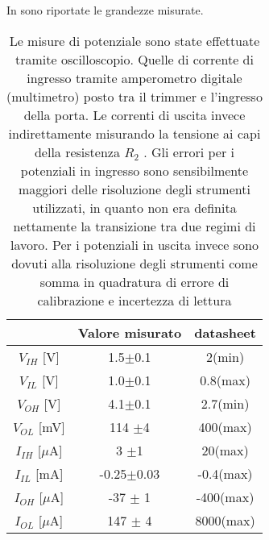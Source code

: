 In  sono riportate le grandezze misurate.\\
\begin{table}[h]
	\centering
	\begin{tabular}{ccc}
		{} & {Valore misurato} & {datasheet} \\
		\hline
    $V_{IH}$ [V] 	  & 1.5$\pm$0.1&  2(min) \\
    $V_{IL}$ [V]	  & 1.0$\pm$0.1&  0.8(max)  \\
    $V_{OH}$ [V]	  & 4.1$\pm$0.1&  2.7(min)\\ %
    $V_{OL}$ [mV]     & 114 $\pm$4&   400(max) \\%
    $I_{IH}$ [$\mu$A] & 3 $\pm$1&     20(max)  \\
    $I_{IL}$ [mA]     & -0.25$\pm$0.03&  -0.4(max) \\
    $I_{OH}$ [$\mu$A] & -37 $\pm$ 1&  -400(max)  \\
    $I_{OL}$ [$\mu$A] & 147 $\pm$ 4&  8000(max) \\
	
  
 	\end{tabular}
	\caption{ Le misure di potenziale sono state effettuate tramite oscilloscopio. Quelle di corrente di ingresso tramite amperometro digitale (multimetro) posto tra il trimmer e l'ingresso della porta. Le correnti di uscita invece indirettamente misurando la tensione ai capi della resistenza $R_{2}$ . Gli errori per i potenziali in ingresso sono sensibilmente maggiori delle risoluzione degli strumenti utilizzati, in quanto non era definita nettamente la transizione tra due regimi di lavoro. Per i potenziali in uscita invece sono dovuti alla risoluzione degli strumenti come somma in quadratura di errore di calibrazione  e incertezza di lettura}
	\label{t:tabella}
\end{table}

